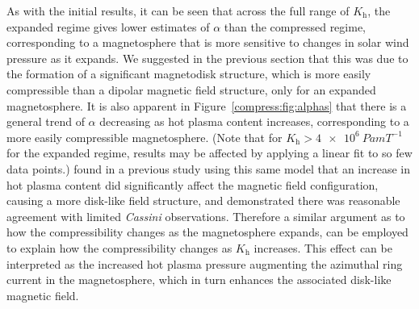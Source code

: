 As with the initial results, it can be seen that across the full range of $K_\mathrm{h}$, the expanded regime gives lower estimates of $\alpha$ than the compressed regime, corresponding to a magnetosphere that is more sensitive to changes in solar wind pressure as it expands. We suggested in the previous section that this was due to the formation of a significant magnetodisk structure, which is more easily compressible than a dipolar magnetic field structure, only for an expanded magnetosphere. It is also apparent in Figure~\ref{compress:fig:alphas} that there is a general trend of $\alpha$ decreasing as hot plasma content increases, corresponding to a more easily compressible magnetosphere. (Note that for $K_\mathrm{h} > \SI{4e6}{Pa m T^{-1}}$ for the expanded regime, results may be affected by applying a linear fit to so few data points.) \citet{achilleos2010b} found in a previous study using this same model that an increase in hot plasma content did significantly affect the magnetic field configuration, causing a more disk-like field structure, and demonstrated there was reasonable agreement with limited \textit{Cassini} observations. Therefore a similar argument as to how the compressibility changes as the magnetosphere expands, can be employed to explain how the compressibility changes as $K_\mathrm{h}$ increases. This effect can be interpreted as the increased hot plasma pressure augmenting the azimuthal ring current in the magnetosphere, which in turn enhances the associated disk-like magnetic field.

